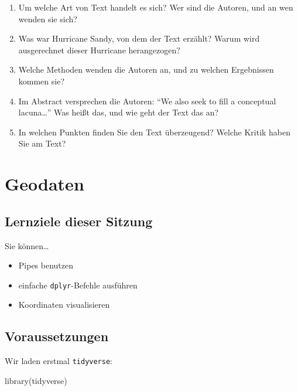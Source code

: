 \documentclass[11pt,german,a4paper]{article}
\newenvironment{Shaded}{\begin{snugshade}}{\end{snugshade}}
\newcommand{\FunctionTok}[1]{\textcolor[rgb]{0.00,0.00,0.00}{#1}}
\newcommand{\NormalTok}[1]{#1}
\providecommand{\tightlist}{%
  \setlength{\itemsep}{0pt}\setlength{\parskip}{0pt}}
\begin{document}
\begin{enumerate}
\def\labelenumi{\arabic{enumi}.}
\tightlist
\item
  Um welche Art von Text handelt es sich? Wer sind die Autoren, und an wen wenden sie sich?
\item
  Was war Hurricane Sandy, von dem der Text erzählt? Warum wird ausgerechnet dieser Hurricane herangezogen?
\item
  Welche Methoden wenden die Autoren an, und zu welchen Ergebnissen kommen sie?
\item
  Im Abstract versprechen die Autoren: ``We also seek to fill a conceptual lacuna\ldots{}'' Was heißt das, und wie geht der Text das an?
\item
  In welchen Punkten finden Sie den Text überzeugend? Welche Kritik haben Sie am Text?
\end{enumerate}

\hypertarget{geodaten}{%
\section{Geodaten}\label{geodaten}}

\hypertarget{lernziele-dieser-sitzung-2}{%
\subsection{Lernziele dieser Sitzung}\label{lernziele-dieser-sitzung-2}}

Sie können\ldots{}

\begin{itemize}
\tightlist
\item
  Pipes benutzen
\item
  einfache \texttt{dplyr}-Befehle ausführen
\item
  Koordinaten visualisieren
\end{itemize}

\hypertarget{voraussetzungen-1}{%
\subsection{Voraussetzungen}\label{voraussetzungen-1}}

Wir laden erstmal \texttt{tidyverse}:

\begin{Shaded}
\begin{Highlighting}[]
\FunctionTok{library}\NormalTok{(tidyverse)}
\end{Highlighting}
\end{Shaded}
\end{document}
